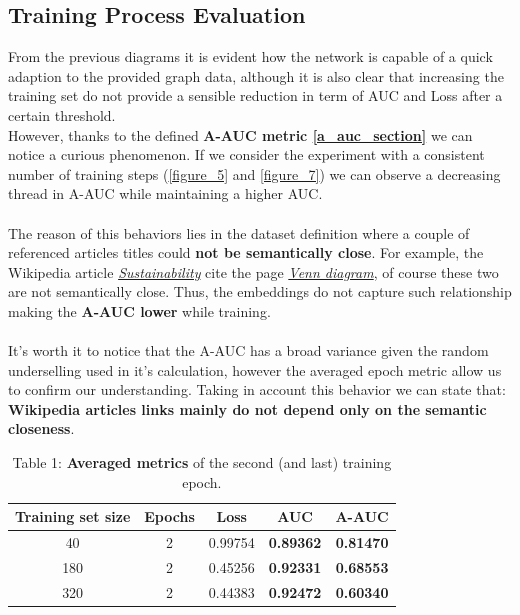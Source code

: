 \documentclass[11pt]{article}
\begin{document}
	\clearpage
	\subsection{Training Process Evaluation}
	From the previous diagrams it is evident how the network is capable of a quick adaption to the provided graph data, although it is also clear that increasing the training set do not provide a sensible reduction in term of AUC and Loss after a certain threshold.\\
	However, thanks to the defined \textbf{A-AUC metric \ref{a_auc_section}} we can notice a curious phenomenon. 
	If we consider the experiment with a consistent number of training steps (\ref{figure_5} and \ref{figure_7}) we can observe a decreasing thread in A-AUC while maintaining a higher AUC.\\\\
	The reason of this behaviors lies in the dataset definition where a couple of referenced articles titles could \textbf{not be semantically close}. For example, the Wikipedia article \href{https://en.wikipedia.org/wiki/Sustainability}{\textit{Sustainability}} cite the page \href{https://en.wikipedia.org/wiki/Venn_diagram}{\textit{Venn diagram}}, of course these two are not semantically close. Thus, the embeddings do not capture such relationship making the \textbf{A-AUC lower} while training.\\\\
	It's worth it to notice that the A-AUC has a broad variance given the random underselling used in it's calculation, however the averaged epoch metric allow us to confirm our understanding.
	Taking in account this behavior we can state that: \textbf{Wikipedia articles links mainly do not depend only on the semantic closeness}. 
	
	\begin{table}[h!]
		\label{table_1}
		\centering
		\begin{tabular}{ccccc}
			\toprule
			Training set size & Epochs & Loss & \textbf{AUC} & \textbf{A-AUC} \\
			\midrule
			40  & 2 & 0.99754 & \textbf{0.89362} & \textbf{0.81470} \\
			180 & 2 & 0.45256 & \textbf{0.92331} & \textbf{0.68553} \\
			320 & 2 & 0.44383 & \textbf{0.92472} & \textbf{0.60340} \\
			\bottomrule
		\end{tabular}
		\caption{Table 1: \textbf{Averaged metrics} of the second (and last) training epoch.}
	\end{table}
	
\end{document}
